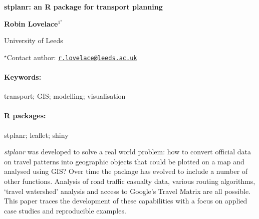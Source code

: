 \documentclass[11pt, a4paper]{article}
\renewcommand{\title}[1]{\begin{center}{\bf \LARGE #1}\end{center}}
\newcommand{\keywords}{\paragraph{Keywords:}}
\newcommand{\packages}{\paragraph{R packages:}}
\begin{document}
\pagestyle{empty}

\title{stplanr: an R package for transport planning}

\begin{center}
  {\bf Robin Lovelace$^{1^\star}$}
\end{center}

\vskip 0.3cm

\begin{affiliations}
\begin{enumerate}
\begin{minipage}{0.915\textwidth}
\centering
\item University of Leeds \\[-2pt]
\end{minipage}
\end{enumerate}
$^\star$Contact author: \href{mailto:r.lovelace@leeds.ac.uk}{\nolinkurl{r.lovelace@leeds.ac.uk}}\\
\end{affiliations}

\vskip 0.5cm

\begin{minipage}{0.915\textwidth}
\keywords transport; GIS; modelling; visualisation
\packages stplanr; leaflet; shiny
\end{minipage}

\vskip 0.8cm

\emph{stplanr} was developed to solve a real world problem: how to
convert official data on travel patterns into geographic objects that
could be plotted on a map and analysed using GIS? Over time the package
has evolved to include a number of other functions. Analysis of road
traffic casualty data, various routing algorithms, `travel watershed'
analysis and access to Google's Travel Matrix are all possible. This
paper traces the development of these capabilities with a focus on
applied case studies and reproducible examples.
\end{document}
